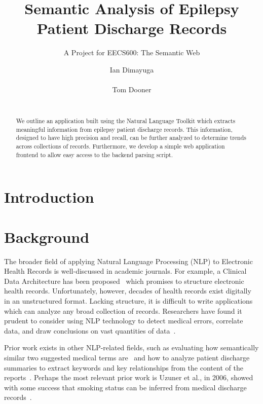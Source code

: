\documentclass{acm_proc_article-sp}
\begin{document}
\title{Semantic Analysis of Epilepsy Patient Discharge Records}
\subtitle{A Project for EECS600: The Semantic Web}
\author{
\alignauthor Ian Dimayuga \\
    \\
\alignauthor Tom Dooner \\
    \\
}
\maketitle
\begin{abstract}
We outline an application built using the Natural Language Toolkit\cite{nltk} which extracts meaningful information
from epilepsy patient discharge records. This information, designed to have high precision and recall, can be further
analyzed to determine trends across collections of records. Furthermore, we develop a simple web application frontend
to allow easy access to the backend parsing script.
\end{abstract}

\section{Introduction}

\section{Background}
The broader field of applying Natural Language Processing (NLP) to Electronic Health Records
is well-discussed in academic journals. For example, a Clinical Data Architecture has been
proposed~\cite{CDA} which promises to structure electronic health records. Unfortunately, however,
decades of health records exist digitally in an unstructured format. Lacking structure, it is
difficult to write applications which can analyze any broad collection of records. Researchers
have found it prudent to consider using NLP technology to detect medical errors, correlate data, 
and draw conclusions on vast quantities of data~\cite{friedman}.

Prior work exists in other NLP-related fields, such as evaluating how semantically similar 
two suggested medical terms are~\cite{Pedersen2007288} and how to analyze patient
discharge summaries to extract keywords and key relationships from the content of the
reports~\cite{soderland}. Perhaps the most relevant prior work is Uzuner et al., in 2006,
showed with some success that smoking status can be inferred from medical discharge 
records~\cite{Uzuner200814}.
\end{document}
